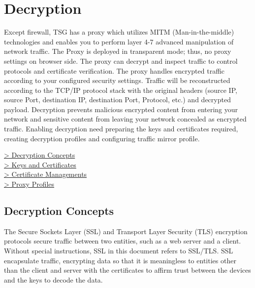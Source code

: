 %
\chapter*{\hypertarget{link:Decryption}{Decryption}}
\label{sec:decrypt}

Except firewall, TSG has a proxy which utilizes MITM (Man-in-the-middle) technologies and enables you to perform layer 4-7 advanced manipulation of network traffic. 
The Proxy is deployed in transparent mode; thus, no proxy settings on browser side. The proxy can decrypt and inspect traffic to control protocols and certificate verification. 
The proxy handles encrypted traffic according to your configured security settings. Traffic will be reconstructed according to the TCP/IP protocol stack with the original headers 
(source IP, source Port, destination IP, destination Port, Protocol, etc.) and decrypted payload. Decryption prevents malicious encrypted content from entering your network 
and sensitive content from leaving your network concealed as encrypted traffic. 
Enabling decryption need preparing the keys and certificates required, creating decryption profiles and configuring traffic mirror profile. 

{
\color{linkblue}
\hyperlink{link:Decryption Concepts}{> Decryption Concepts} \\
\hyperlink{link:Keys and Certificates}{> Keys and Certificates} \\
\hyperlink{link:Certificate Managements}{> Certificate Managements}\\
\hyperlink{link:Proxy Profiles}{> Proxy Profiles}\\
}
\clearpage

\section*{\hypertarget{link:Decryption Concepts}{Decryption Concepts}}
\label{sec:decrypt:concept}

The Secure Sockets Layer (SSL) and Transport Layer Security (TLS) encryption protocols secure traffic between two entities, such as a web server and a client. Without special instructions, SSL in this document refers to SSL/TLS. SSL encapsulate traffic, encrypting data so that it is meaningless to entities other than the client and server with the certificates to affirm trust between the devices and the keys to decode the data.


